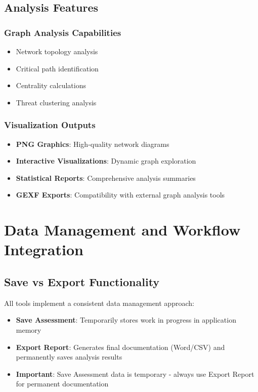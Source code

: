 \documentclass[binding=0.6cm]{sapthesis}
\begin{document}
\subsection{Analysis Features}

\subsubsection{Graph Analysis Capabilities}
\begin{itemize}
    \item Network topology analysis
    \item Critical path identification
    \item Centrality calculations
    \item Threat clustering analysis
\end{itemize}

\subsubsection{Visualization Outputs}
\begin{itemize}
    \item \textbf{PNG Graphics}: High-quality network diagrams
    \item \textbf{Interactive Visualizations}: Dynamic graph exploration
    \item \textbf{Statistical Reports}: Comprehensive analysis summaries
    \item \textbf{GEXF Exports}: Compatibility with external graph analysis tools
\end{itemize}

\section{Data Management and Workflow Integration}

\subsection{Save vs Export Functionality}

All tools implement a consistent data management approach:

\begin{itemize}
    \item \textbf{Save Assessment}: Temporarily stores work in progress in application memory
    \item \textbf{Export Report}: Generates final documentation (Word/CSV) and permanently saves analysis results
    \item \textbf{Important}: Save Assessment data is temporary - always use Export Report for permanent documentation
\end{itemize}
\end{document}
